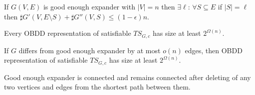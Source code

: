 {
\myth If $G(V,E)$ is good enough expander with $|V|=n$ then  $\exists \ell$:
$\forall S\subseteq E$ if $|S|=\ell$ then $\sharp G'(V, E\setminus S)+ \sharp G''(V,S)\le (1-\epsilon) n$.

\pause \mycor Every OBDD representation of satisfiable $TS_{G,c}$ has size at least $2^{\Omega(n)}$.

\pause \mycor If $G$ differs from good enough expander by at most $o(n)$ edges, then
OBDD representation of satisfiable $TS_{G,c}$ has size at least $2^{\Omega(n)}$.

\pause \mylem Good enough expander is connected and remains connected after deleting of any two vertices
and edges from the shortest path between them.

}


